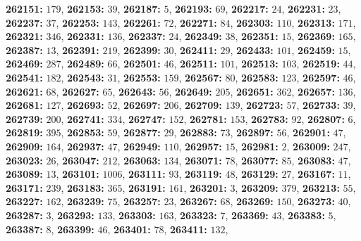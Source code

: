 \textsf{\bfseries 262151:} $179$, \textsf{\bfseries 262153:} $39$, \textsf{\bfseries 262187:} $5$, \textsf{\bfseries 262193:} $69$, \textsf{\bfseries 262217:} $24$, \textsf{\bfseries 262231:} $23$, \textsf{\bfseries 262237:} $37$, \textsf{\bfseries 262253:} $143$, \textsf{\bfseries 262261:} $72$, \textsf{\bfseries 262271:} $84$, \textsf{\bfseries 262303:} $110$, \textsf{\bfseries 262313:} $171$, \textsf{\bfseries 262321:} $346$, \textsf{\bfseries 262331:} $136$, \textsf{\bfseries 262337:} $24$, \textsf{\bfseries 262349:} $38$, \textsf{\bfseries 262351:} $15$, \textsf{\bfseries 262369:} $165$, \textsf{\bfseries 262387:} $13$, \textsf{\bfseries 262391:} $219$, \textsf{\bfseries 262399:} $30$, \textsf{\bfseries 262411:} $29$, \textsf{\bfseries 262433:} $101$, \textsf{\bfseries 262459:} $15$, \textsf{\bfseries 262469:} $287$, \textsf{\bfseries 262489:} $66$, \textsf{\bfseries 262501:} $46$, \textsf{\bfseries 262511:} $101$, \textsf{\bfseries 262513:} $103$, \textsf{\bfseries 262519:} $44$, \textsf{\bfseries 262541:} $182$, \textsf{\bfseries 262543:} $31$, \textsf{\bfseries 262553:} $159$, \textsf{\bfseries 262567:} $80$, \textsf{\bfseries 262583:} $123$, \textsf{\bfseries 262597:} $46$, \textsf{\bfseries 262621:} $68$, \textsf{\bfseries 262627:} $65$, \textsf{\bfseries 262643:} $56$, \textsf{\bfseries 262649:} $205$, \textsf{\bfseries 262651:} $362$, \textsf{\bfseries 262657:} $136$, \textsf{\bfseries 262681:} $127$, \textsf{\bfseries 262693:} $52$, \textsf{\bfseries 262697:} $206$, \textsf{\bfseries 262709:} $139$, \textsf{\bfseries 262723:} $57$, \textsf{\bfseries 262733:} $39$, \textsf{\bfseries 262739:} $200$, \textsf{\bfseries 262741:} $334$, \textsf{\bfseries 262747:} $152$, \textsf{\bfseries 262781:} $153$, \textsf{\bfseries 262783:} $92$, \textsf{\bfseries 262807:} $6$, \textsf{\bfseries 262819:} $395$, \textsf{\bfseries 262853:} $59$, \textsf{\bfseries 262877:} $29$, \textsf{\bfseries 262883:} $73$, \textsf{\bfseries 262897:} $56$, \textsf{\bfseries 262901:} $47$, \textsf{\bfseries 262909:} $164$, \textsf{\bfseries 262937:} $47$, \textsf{\bfseries 262949:} $110$, \textsf{\bfseries 262957:} $15$, \textsf{\bfseries 262981:} $2$, \textsf{\bfseries 263009:} $247$, \textsf{\bfseries 263023:} $26$, \textsf{\bfseries 263047:} $212$, \textsf{\bfseries 263063:} $134$, \textsf{\bfseries 263071:} $78$, \textsf{\bfseries 263077:} $85$, \textsf{\bfseries 263083:} $47$, \textsf{\bfseries 263089:} $13$, \textsf{\bfseries 263101:} $1006$, \textsf{\bfseries 263111:} $93$, \textsf{\bfseries 263119:} $48$, \textsf{\bfseries 263129:} $27$, \textsf{\bfseries 263167:} $11$, \textsf{\bfseries 263171:} $239$, \textsf{\bfseries 263183:} $365$, \textsf{\bfseries 263191:} $161$, \textsf{\bfseries 263201:} $3$, \textsf{\bfseries 263209:} $379$, \textsf{\bfseries 263213:} $55$, \textsf{\bfseries 263227:} $162$, \textsf{\bfseries 263239:} $75$, \textsf{\bfseries 263257:} $23$, \textsf{\bfseries 263267:} $68$, \textsf{\bfseries 263269:} $150$, \textsf{\bfseries 263273:} $40$, \textsf{\bfseries 263287:} $3$, \textsf{\bfseries 263293:} $133$, \textsf{\bfseries 263303:} $163$, \textsf{\bfseries 263323:} $7$, \textsf{\bfseries 263369:} $43$, \textsf{\bfseries 263383:} $5$, \textsf{\bfseries 263387:} $8$, \textsf{\bfseries 263399:} $46$, \textsf{\bfseries 263401:} $78$, \textsf{\bfseries 263411:} $132$, 
